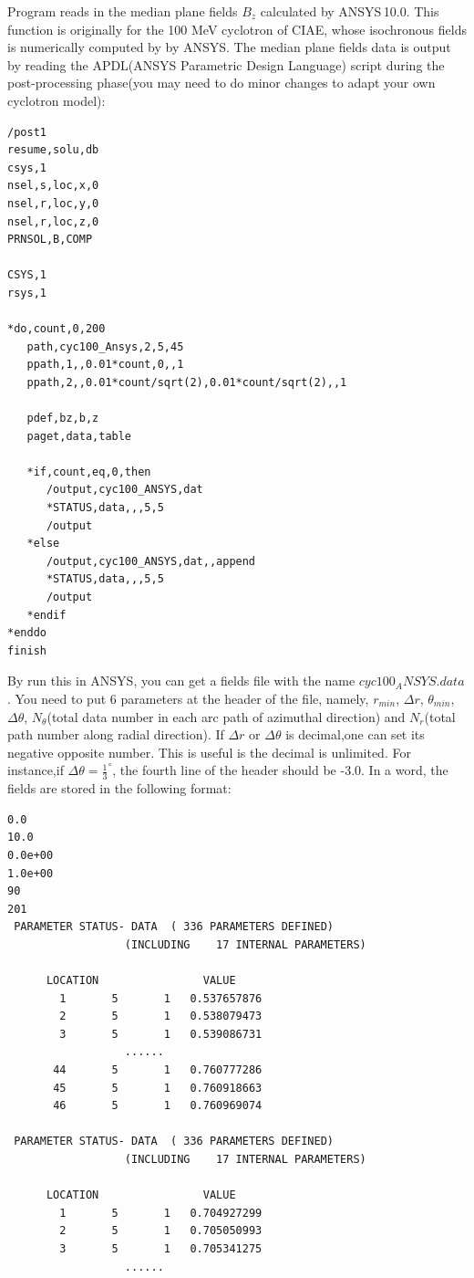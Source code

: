 Program reads in the median plane fields $B_z$ calculated by ANSYS\,10.0.  This function is originally for the 100 MeV cyclotron of CIAE,
 whose isochronous fields is numerically computed by by ANSYS. The median plane fields data is output by reading the APDL(ANSYS Parametric Design Language) script
during the post-processing phase(you may need to do minor changes to adapt your own cyclotron model):
\begin{verbatim}
/post1
resume,solu,db
csys,1
nsel,s,loc,x,0
nsel,r,loc,y,0
nsel,r,loc,z,0
PRNSOL,B,COMP

CSYS,1
rsys,1

*do,count,0,200
   path,cyc100_Ansys,2,5,45
   ppath,1,,0.01*count,0,,1
   ppath,2,,0.01*count/sqrt(2),0.01*count/sqrt(2),,1

   pdef,bz,b,z
   paget,data,table
   
   *if,count,eq,0,then
      /output,cyc100_ANSYS,dat
      *STATUS,data,,,5,5
      /output
   *else
      /output,cyc100_ANSYS,dat,,append
      *STATUS,data,,,5,5
      /output
   *endif
*enddo
finish
\end{verbatim}
By run this in ANSYS, you can get a fields file with the name $cyc100_ANSYS.data$. 
You need to  put 6 parameters at the header of the file, namely, $r_{min}$, $\Delta r$, $\theta_{min}$, $\Delta \theta$, 
$N_\theta$(total data number in each arc path of azimuthal direction) and $N_r$(total path number along radial direction). 
If $\Delta r$ or $\Delta \theta$ is decimal,one can set its negative opposite number. This is useful is the decimal is unlimited. 
For instance,if $\Delta \theta = \frac{1}{3}^\circ$, the fourth line of the header should be -3.0. 
In a word, the fields are stored in the following format:
\begin{verbatim}
0.0
10.0
0.0e+00
1.0e+00
90
201
 PARAMETER STATUS- DATA  ( 336 PARAMETERS DEFINED)
                  (INCLUDING    17 INTERNAL PARAMETERS)

      LOCATION                VALUE
        1       5       1   0.537657876    
        2       5       1   0.538079473    
        3       5       1   0.539086731    
                  ......
       44       5       1   0.760777286    
       45       5       1   0.760918663    
       46       5       1   0.760969074    

 PARAMETER STATUS- DATA  ( 336 PARAMETERS DEFINED)
                  (INCLUDING    17 INTERNAL PARAMETERS)

      LOCATION                VALUE
        1       5       1   0.704927299    
        2       5       1   0.705050993    
        3       5       1   0.705341275    
                  ......
\end{verbatim}

